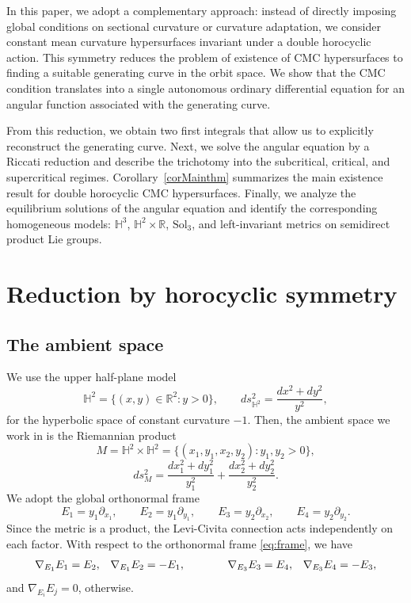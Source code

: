 \documentclass[11pt,a4paper]{amsart}
\theoremstyle{plain}
\theoremstyle{remark}
\newcommand{\R}{\mathbb{R}}
\newcommand{\Hyp}{\mathbb{H}}
\begin{document}
In this paper, we adopt a complementary approach: instead of directly
imposing global conditions on sectional curvature or curvature adaptation,
we consider constant mean curvature hypersurfaces invariant under a double
horocyclic action. This symmetry reduces the problem of existence
of CMC hypersurfaces to finding a suitable
generating curve in the orbit space. We show that the CMC condition
translates into a single autonomous ordinary differential equation for an
angular function associated with the generating curve.

From this reduction, we obtain two first integrals that allow us to
explicitly reconstruct the generating curve. Next, we solve the angular
equation by a Riccati reduction and describe the trichotomy into the
subcritical, critical, and supercritical regimes. Corollary~\ref{corMainthm}
summarizes the main existence result for double horocyclic CMC hypersurfaces.
Finally, we analyze the equilibrium solutions of the angular equation and
identify the corresponding homogeneous models: $\Hyp^3$,
$\Hyp^2\times\R$, $\mathrm{Sol}_3$, and left-invariant metrics on
semidirect product Lie groups.





\section{Reduction by horocyclic symmetry}
\label{sec:setup}


\subsection{The ambient space}

We use the upper half-plane model 
\[
\Hyp^2=\{(x,y)\in\R^2:y>0\},
\qquad 
ds_{\Hyp^2}^2=\frac{dx^2+dy^2}{y^2},
\]
for the hyperbolic space of constant curvature $-1$. Then, the ambient space
we work in is the Riemannian product
\[
M=\Hyp^2\times\Hyp^2=\{(x_1,y_1,x_2,y_2):y_1,y_2>0\},
\]
\[
ds_M^2=\frac{dx_1^2+dy_1^2}{y_1^2}+\frac{dx_2^2+dy_2^2}{y_2^2}.
\]
We adopt the global orthonormal frame
\begin{equation}\label{eq:frame}
E_1=y_1\partial_{x_1},\qquad E_2=y_1\partial_{y_1},
\qquad
E_3=y_2\partial_{x_2},\qquad E_4=y_2\partial_{y_2}.
\end{equation}
Since the metric is a product, the Levi-Civita connection acts independently 
on each factor. With respect to the orthonormal frame \eqref{eq:frame}, we have
\begin{equation}\label{eq:ambient-connection}
\begin{array}{c@{\qquad\qquad}c}
\begin{aligned}
\nabla_{E_1}E_1&=E_2, &
\nabla_{E_1}E_2&=-E_1,\\
\end{aligned}
&
\begin{aligned}
\nabla_{E_3}E_3&=E_4, &
\nabla_{E_3}E_4&=-E_3,\\
\end{aligned}
\end{array}
\end{equation}
and $\nabla_{E_i}E_j=0 $, otherwise.
\end{document}
